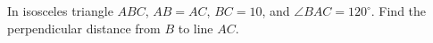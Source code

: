 In isosceles triangle $ABC$, $AB=AC$, $BC=10$, and $\angle BAC=120^\circ$. Find the perpendicular distance from $B$ to line $AC$.
